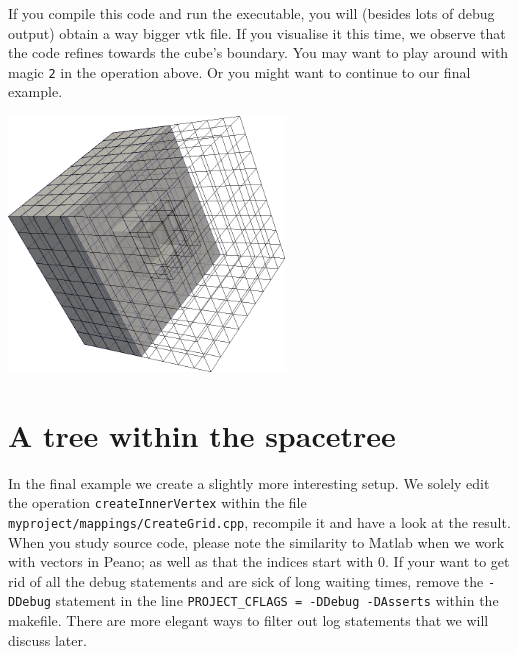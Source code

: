 \noindent
If you compile this code and run the executable, you will (besides lots of
debug output) obtain a way bigger vtk file. 
If you visualise it this time, we observe that the code refines towards the
cube's boundary. 
You may want to play around with magic \texttt{2} in the operation above. 
Or you might want to continue to our final example.

\begin{center}
  \includegraphics[width=0.55\textwidth]{2_quickstart/cube.png}
\end{center}


\section{A tree within the spacetree}

In the final example we create a slightly more interesting setup. 
We solely edit the operation \texttt{createInnerVertex} within the  
file \texttt{myproject/mappings/CreateGrid.cpp}, recompile it and 
have a look at the result.
When you study source code, please note the similarity to Matlab when we work
with vectors in Peano; as well as that the indices start with 0.
If your want to get rid of all the debug statements and are sick of long 
waiting times, remove the \texttt{-DDebug} statement in the line  
\texttt{PROJECT\_CFLAGS = -DDebug -DAsserts}
within the makefile.
There are more elegant ways to filter out log statements that we will discuss
later.


